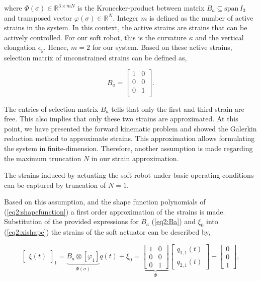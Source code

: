 where $\Phi(\sigma) \in \mathbb{R}^{3 \times mN}$ is the Kronecker-product between matrix $B_a \subseteq \text{span} \hspace{2pt} I_3$ and transposed vector $\varphi(\sigma) \in \mathbb{R}^N$. Integer $m$ is defined as the number of active strains in the system. In this context, the active strains are strains that can be actively controlled. For our soft robot, this is the curvature $\kappa$ and the vertical elongation $\epsilon_y$. Hence, $m=2$ for our system. Based on these active strains, selection matrix of unconstrained strains can be defined as,

\begin{equation}
    B_a = \begin{bmatrix}
    1 & 0 \\
    0 & 0  \\
    0 & 1  \\
    \end{bmatrix}.
    \label{eq2:Ba}
\end{equation}

The entries of selection matrix $B_a$ tells that only the first and third strain are free. This also implies that only these two strains are approximated. At this point, we have presented the forward kinematic problem and showed the Galerkin reduction method to approximate strains. This approximation allows formulating the system in finite-dimension. Therefore, another assumption is made regarding the maximum truncation $N$ in our strain approximation.

\begin{theorem}
The strains induced by actuating the soft robot under basic operating conditions can be captured by truncation of $N = 1$. 
\end{theorem}

Based on this assumption, and the shape function polynomials of (\ref{eq2:shapefunction}) a first order approximation of the strains is made. Substitution of the provided expressions for $B_a$ (\ref{eq2:Ba}) and $\xi_0$ into (\ref{eq2:xishape}) the strains of the soft actuator can be described by,


\begin{equation}
    \begin{bmatrix}\xi(t)\end{bmatrix}_1 =\underbrace{B_a \otimes [\varphi_1]}_{\Phi(\sigma)} q(t) + \xi_0  =  \underbrace{\begin{bmatrix}
    1 & 0  \\
    0 & 0  \\
    0 & 1
    \end{bmatrix}}_{\Phi} \begin{bmatrix} q_{1,1}(t) \\  q_{2,1}(t) \end{bmatrix} +  \begin{bmatrix} 0 \\ 0 \\ 1   \end{bmatrix},
\label{eq2:xiapprox}
\end{equation}

